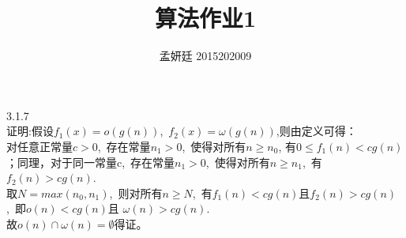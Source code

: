 \documentclass[19pt]{article}
\title{算法作业1}
\author{孟妍廷 2015202009}
\date{}
\begin{document}
\maketitle


3.1.7\\
\indent 证明:\quad 假设$f_1(x)=o(g(n))$,\ $f_2(x)=\omega(g(n))$,则由定义可得：\\
\indent 对任意正常量$c>0$,\ 存在常量$n_1>0$,\ 使得对所有$n\ge n_0$, 有$0 \le f_1(n)<cg(n)$；同理，对于同一常量c,\ 存在常量$n_1>0$,\ 使得对所有$n\ge n_1$,\ 有$f_2(n)>cg(n)$. \\
\indent 取$N=max(n_0,n_1)$,\ 则对所有$n\ge N$,\ 有$f_1(n)<cg(n)$且$f_2(n)>cg(n)$,\ 即$o(n)<cg(n)$且 $\omega(n)>cg(n)$. \\
\indent 故$o(n)\cap \omega(n)=\emptyset$得证。\\
\end{document}
